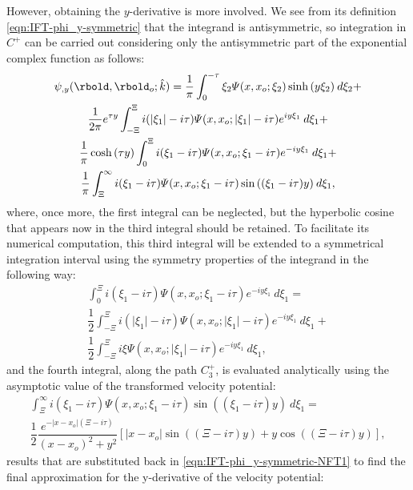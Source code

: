 However, obtaining the $y$-derivative is more involved. We see from its definition \eqref{eqn:IFT-phi_y-symmetric} that the integrand is antisymmetric, so integration in $C^{+}$ can be carried out considering only the antisymmetric part of the exponential complex function as follows:
%
\begin{multline}
\label{eqn:IFT-phi_y-symmetric-NFT1}
\psi_{,y}(\rbold,\rbold_{o}; \hat{k}) = 
\dfrac{1}{\pi} \int_{0}^{-\tau} \xi_{2} \varPsi (x,x_o;\xi_{2}) \sinh{(y \xi_{2})} \:d\xi _{2} +
\\
\dfrac{1}{2\pi} e^{\tau y}\int_{-\Xi}^{\Xi} 
i (\vert \xi_{1} \vert -i\tau) \varPsi (x,x_o;|\xi_{1}|-i\tau) e^{i y \xi_{1}} \:d\xi_{1} + 
\\
\dfrac{1}{\pi} \cosh{(\tau y)} \int_{0}^{\Xi} i(\xi_{1}-i\tau) \varPsi (x,x_o;\xi_{1}-i\tau) e^{-i y \xi_{1}} \: d\xi_{1} + 
\\
\dfrac{1}{\pi} \int_{\Xi}^{\infty} i(\xi_{1}-i\tau) \varPsi (x,x_o;\xi_{1}-i\tau) \sin{((\xi_{1}-i\tau)y)} \:d\xi_{1},
\end{multline}
%
where, once more, the first integral can be neglected, but the hyperbolic cosine that appears now in the third integral should be retained. To facilitate its numerical computation, this third integral will be extended to a symmetrical integration interval using the symmetry properties of the integrand in the following way:
%
\begin{multline}
\label{eqn:IFT-phi_y-symmetric-NFT2}
\int_{0}^{\Xi} i(\xi_{1}-i\tau) \varPsi (x,x_o;\xi_{1}-i\tau) e^{-i y \xi_{1}} \: d\xi_{1} =
\\
\dfrac{1}{2}\int_{-\Xi}^{\Xi} i(\vert \xi_{1} \vert -i\tau) \varPsi (x,x_o; \vert \xi_{1} \vert -i\tau) e^{-i y \xi_{1}} \:d\xi_{1} +
\\
\dfrac{1}{2}\int_{-\Xi}^{\Xi} i\xi \varPsi (x,x_o;\vert \xi_{1} \vert -i\tau) e^{-i y \xi_{1}} \:d\xi_{1},
\end{multline}
%
and the fourth integral, along the path $C_3^+$, is evaluated analytically using the asymptotic value of the transformed velocity potential:
\begin{multline}
\label{eqn:IFT-phi_y-symmetric-NFT3}
\int_{\Xi}^{\infty} i(\xi_{1}-i\tau) \varPsi (x,x_o;\xi_{1}-i\tau) \sin{((\xi_{1}-i\tau)y)} \:d\xi_{1} =
\\
\dfrac{1}{2} \dfrac{e^{-| x-x_o | (\Xi-i \tau)}}{(x-x_o)^{2}+y^{2}} \left[| x-x_o| \sin((\Xi-i\tau)y) +y \cos((\Xi-i\tau)y) \right],
\end{multline}
%
results that are substituted back in \eqref{eqn:IFT-phi_y-symmetric-NFT1} to find the final approximation for the y-derivative of the velocity potential:

